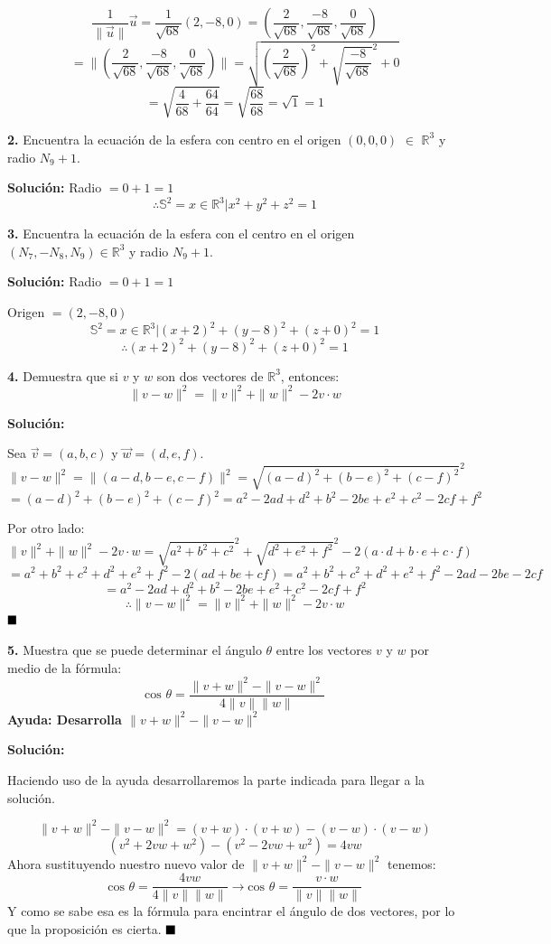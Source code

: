 \documentclass{article}
\begin{document}
$$\frac{1}{\|\vec{u}\|}\vec{u} = \frac{1}{\sqrt{68}}(2,-8,0)= (\frac{2}{\sqrt{68}}, \frac{-8}{\sqrt{68}}, \frac{0}{\sqrt{68}})$$
$$= \|(\frac{2}{\sqrt{68}}, \frac{-8}{\sqrt{68}}, \frac{0}{\sqrt{68}})\| = \sqrt{(\frac{2}{\sqrt{68}})^2+ \sqrt{\frac{-8}{\sqrt{68}}}^2+0}$$
$$= \sqrt{\frac{4}{68}+\frac{64}{64}} = \sqrt{\frac{68}{68}} = \sqrt{1} = 1$$

\textbf{2.} Encuentra la ecuación de la esfera con centro en el origen $(0,0,0)$ $\in$ $\mathbb{R}^3$ y radio $N_9+1$. 
\vspace{10pt}

\textbf{Solución:}
Radio $=0+1 = 1$
$$\therefore \mathbb{S}^2={x \in \mathbb{R}^3| x^2+y^2+z^2 = 1}$$

\textbf{3.} Encuentra la ecuación de la esfera con el centro en el origen $(N_7, -N_8, N_9) \in \mathbb{R}^3$ y radio $N_9+1$.
\vspace{10pt}

\textbf{Solución:}
Radio $= 0+1 = 1$
\par
Origen $= (2, -8 ,  0)$
$$ \mathbb{S}^2={x \in \mathbb{R}^3| (x+2)^2+(y-8)^2+(z+0)^2 = 1}$$
$$\therefore (x+2)^2+(y-8)^2+(z+0)^2 = 1$$

\textbf{4.} Demuestra que si $v$ y $w$ son dos vectores de $\mathbb{R}^3$, entonces:
$$\|v-w\|^2 = \|v\|^2+\|w\|^2- 2v\cdot w$$

\textbf{Solución: }
\vspace{10pt}

Sea $\vec{v} = (a,b,c)$ y $\vec{w}=(d,e,f)$.
$$\|v-w\|^2 =\|(a-d,b-e,c-f)\|^2 = \sqrt{(a-d)^2+(b-e)^2+(c-f)^2}^2$$
$$= (a-d)^2+(b-e)^2+(c-f)^2 = a^2-2ad+d^2+b^2-2be+e^2+c^2-2cf+f^2$$

Por otro lado: 
$$\|v\|^2+\|w\|^2- 2v\cdot w = \sqrt{a^2+b^2+c^2}^2 +\sqrt{d^2+e^2+f^2}^2-2(a\cdot d+b\cdot e + c\cdot f)$$
$$= a^2+b^2+c^2+d^2+e^2+f^2 -2(ad+be+cf) = a^2+b^2+c^2+d^2+e^2+f^2 -2ad -2be-2cf$$
$$= a^2-2ad+d^2+b^2-2be+e^2+c^2-2cf+f^2$$
$$\therefore \|v-w\|^2 = \|v\|^2+\|w\|^2- 2v\cdot w$$
\vspace{10pt}
$\hfill\blacksquare$
\vspace{10pt}

\textbf{5.} Muestra que se puede determinar el ángulo $\theta$ entre los vectores $v$ y $w$ por medio de 
la fórmula: 
$$\text{cos }\theta = \frac{\|v+w\|^2-\|v-w\|^2}{4\|v\|\|w\|}$$
\textbf{Ayuda: Desarrolla $\|v+w\|^2-\|v-w\|^2$}
\vspace{10pt}

\textbf{Solución:} \par
Haciendo uso de la ayuda desarrollaremos la parte indicada para llegar a la solución. \par
$$\|v+w\|^2-\|v-w\|^2 = (v+w)\cdot(v+w)-(v-w)\cdot(v-w)$$
$$(v^2+2vw+w^2)-(v^2-2vw+w^2) = 4vw$$
Ahora sustituyendo nuestro nuevo valor de $\|v+w\|^2-\|v-w\|^2$ tenemos:
$$\text{cos }\theta = \frac{4vw}{4\|v\|\|w\|} \rightarrow \text{cos }\theta = \frac{v\cdot w}{\|v\|\|w\|}$$
Y como se sabe esa es la fórmula para encintrar el ángulo de dos vectores, por lo que la proposición es 
cierta.
$\hfill\blacksquare$
\end{document}
